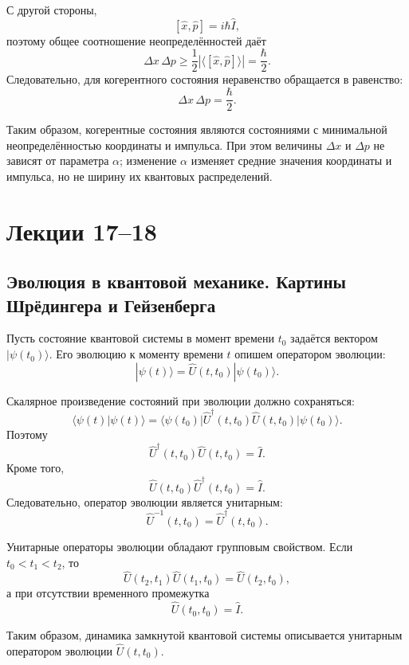 \documentclass[12pt,a4paper]{article}
\begin{document}
С другой стороны,
\[
    [\hat x,\hat p]=i\hbar\hat I,
\]
поэтому общее соотношение неопределённостей даёт
\[
    \Delta x\,\Delta p
    \geq
    \frac12
    \left|
        \langle[\hat x,\hat p]\rangle
    \right|
    =
    \frac{\hbar}{2}.
\]
Следовательно, для когерентного состояния неравенство обращается в
равенство:
\[
    \boxed{
        \Delta x\,\Delta p
        =
        \frac{\hbar}{2}
    }.
\]

Таким образом, когерентные состояния являются состояниями с минимальной
неопределённостью координаты и импульса. При этом величины
$\Delta x$ и $\Delta p$ не зависят от параметра $\alpha$; изменение
$\alpha$ изменяет средние значения координаты и импульса, но не ширину
их квантовых распределений.

\section{Лекции 17--18}

\subsection{Эволюция в квантовой механике. Картины Шрёдингера и Гейзенберга}

Пусть состояние квантовой системы в момент времени $t_0$ задаётся
вектором $|\psi(t_0)\rangle$. Его эволюцию к моменту времени $t$
опишем оператором эволюции:
\[
    \boxed{
        |\psi(t)\rangle
        =
        \hat U(t,t_0)|\psi(t_0)\rangle
    }.
\]

Скалярное произведение состояний при эволюции должно сохраняться:
\[
    \langle\psi(t)|\psi(t)\rangle
    =
    \langle\psi(t_0)|
        \hat U^\dagger(t,t_0)\hat U(t,t_0)
    |\psi(t_0)\rangle.
\]
Поэтому
\[
    \boxed{
        \hat U^\dagger(t,t_0)\hat U(t,t_0)=\hat I
    }.
\]
Кроме того,
\[
    \hat U(t,t_0)\hat U^\dagger(t,t_0)=\hat I.
\]
Следовательно, оператор эволюции является унитарным:
\[
    \boxed{
        \hat U^{-1}(t,t_0)=\hat U^\dagger(t,t_0)
    }.
\]

Унитарные операторы эволюции обладают групповым свойством. Если
$t_0<t_1<t_2$, то
\[
    \boxed{
        \hat U(t_2,t_1)\hat U(t_1,t_0)
        =
        \hat U(t_2,t_0)
    },
\]
а при отсутствии временного промежутка
\[
    \boxed{
        \hat U(t_0,t_0)=\hat I
    }.
\]

Таким образом, динамика замкнутой квантовой системы описывается
унитарным оператором эволюции $\hat U(t,t_0)$.
\end{document}
